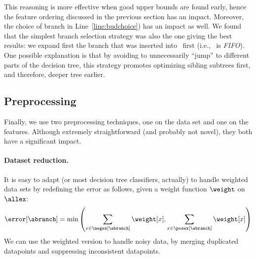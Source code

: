 \documentclass{article}
\begin{document}

This reasoning is more effective when good upper bounds are found early, hence the feature ordering  discussed in the previous section has an impact. Moreover, the choice of branch in Line~\ref{line:budchoice}) has an impact as well. We found that the simplest branch selection strategy was also the one giving the best results: we expand first the branch that was inserted into \bud\ first (i.e., \bud\ is \emph{FIFO}). One possible explanation is that by avoiding to unnecessarily ``jump'' to different parts of the decision tree, this strategy promotes optimizing sibling subtrees first, and therefore, deeper tree earlier.





















\subsection{Preprocessing}
\label{sec:preprocessing}

Finally, we use two preprocessing techniques, one on the data set and one on the features. Although extremely straightforward (and probably not novel), they both have a significant impact.

\paragraph{Dataset reduction.}
It is easy to adapt \budalg (or most decision tree classifiers, actually) to handle weighted data sets by redefining the error as follows, given a weight function $\weight$ on $\allex$:
$$
\error[\abranch] = \min\left( \sum\limits_{x \in \negex[\abranch]}\weight[x], \sum\limits_{x \in \posex[\abranch]}\weight[x] \right)
$$
We can use the weighted version to handle noisy data, by merging duplicated datapoints and suppressing inconsistent datapoints.
\end{document}
